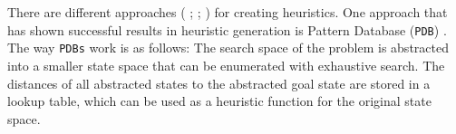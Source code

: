 There are different approaches (\citeauthor{haslum2007domain} \citeyear{haslum2007domain}; \citeauthor{edelkamp2007automated} \citeyear{edelkamp2007automated}; \citeauthor{nissim2011computing} \citeyear{nissim2011computing}) for creating heuristics. %
One approach that has shown successful results in heuristic generation is Pattern Database (\texttt{PDB}) \cite{culberson1998pattern}. The way \texttt{PDBs} work is as follows: The search space of the problem is abstracted into a smaller state space that can be enumerated with exhaustive search. The distances of all abstracted states to the abstracted goal state are stored in a lookup table, which can be used as a heuristic function for the original state space.




